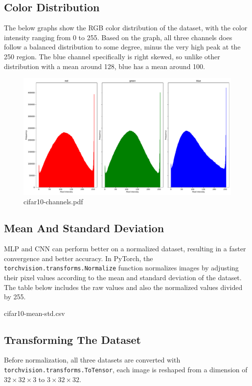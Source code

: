 \documentclass{report}
\begin{document}
\subsection{Color Distribution} 
The below graphs show the RGB color distribution of the dataset, with the color intensity ranging from 0 to 
255. Based on the graph, all three channels does follow a balanced distribution to some degree, minus the very 
high peak at the 250 region. The blue channel specifically is right skewed, so unlike other distribution with a 
mean around 128, blue has a mean around 100.

\begin{figure}[ht]
    \center
    \includegraphics[scale=0.4]{../output/cifar10-channels.pdf}
    \caption{cifar10-channels.pdf}
\end{figure}

\subsection{Mean And Standard Deviation} 
MLP and CNN can perform better on a normalized dataset, resulting in a faster convergence and better accuracy. 
In PyTorch, the \texttt{torchvision.transforms.Normalize} function normalizes images by adjusting their pixel 
values according to the mean and standard deviation of the dataset. The table below includes the raw values 
and also the normalized values divided by 255.

\begin{table}[ht]
    \center
    \caption{cifar10-mean-std.csv}
\end{table}

\subsection{Transforming The Dataset}
Before normalization, all three datasets are converted with \texttt{torchvision.transforms.ToTensor}, each image is 
reshaped from a dimension of $32\times32\times3$ to $3\times32\times32$.
\end{document}
